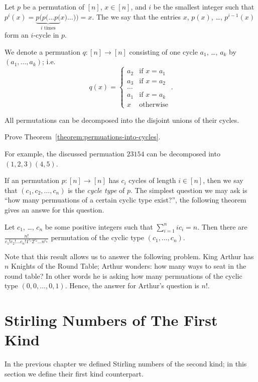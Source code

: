 \begin{definition}
  Let $p$ be a permutation of $[n]$, $x \in [n]$, and $i$ be the smallest
  integer such that
  $p^i(x) = \underbrace{p(p(\dots p(}_{i \text{ times}} x) \dots )) = x$.
  The we say that the entries $x$, $p(x)$, \dots, $p^{i - 1}(x)$ form an
  $i$-cycle in $p$.

  We denote a permuation $q : [n] \to [n]$ consisting of one cycle
  $a_1$, \dots, $a_k$ by $(a_1, \dots, a_k)$; i.e.
  \[
    q(x) =
    \begin{cases}
      a_2 & \text{if } x = a_1 \\
      a_3 & \text{if } x = a_2 \\
      \dots \\
      a_1 & \text{if } x = a_k \\
      x & \text{otherwise}
    \end{cases}.
  \]
\end{definition}

\begin{theorem}
\label{theorem:permuations-into-cycles}
  All permutations can be decomposed into the disjoint unions of their cycles.
\end{theorem}
\begin{exercise}
  Prove Theorem~\ref{theorem:permuations-into-cycles}.
\end{exercise}
For example, the discussed permuation $2 3 1 5 4$ can be decomposed into
$(1, 2, 3) (4, 5)$.

If an permutation $p : [n] \to [n]$ has $c_i$ cycles of length $i \in [n]$, then
we say that $(c_1, c_2, \dots, c_n)$ is the \emph{cycle type} of $p$.
The simplest question we may ask is ``how many permuations of a certain cyclic
type exist?'', the following theorem gives an answe for this question.
\begin{theorem}
  Let $c_1$, \dots, $c_n$ be some positive integers such that
  $\sum_{i = 1}^n i c_i = n$. Then there are
  $\frac{n!}{c_1! c_2! \dots c_n! 1^{c_1} 2^{c_2} \dots n^{c_n}}$
  permutation of the cyclic type $(c_1, \dots, c_n)$.
\end{theorem}

Note that this result allows us to answer the following problem. King Arthur has
$n$ Knights of the Round Table; Arthur wonders: how many ways to seat in the
round table? In other words he is asking how many permuations of the cyclic type
$(0, 0, \dots, 0, 1)$. Hence, the answer for Arthur's question is $n!$.

\section{Stirling Numbers of The First Kind}
In the previous chapter we defined Stirling numbers of the second kind; in this
section we define their first kind counterpart.

